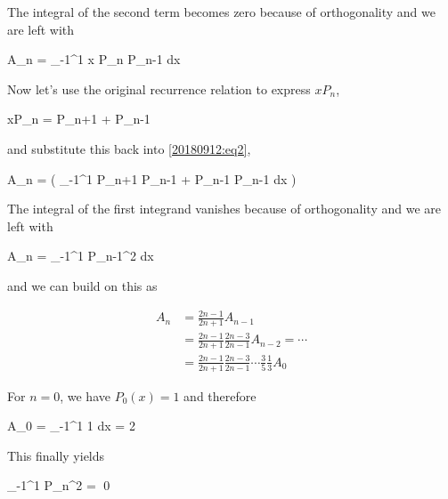 The integral of the second term becomes zero because of orthogonality and we are left with

\be\label{20180912:eq2}
A_n =  \int_{-1}^1 x P_n P_{n-1} dx
\ee

Now let's use the original recurrence relation to express $x P_n$,

\bee
xP_n =  P_{n+1} +  P_{n-1}
\eee

and substitute this back into \eqref{20180912:eq2},

\bee
A_n =  \left( \int_{-1}^1  P_{n+1} P_{n-1} +  P_{n-1} P_{n-1} dx \right)
\eee

The integral of the first integrand vanishes because of orthogonality and we are left with

\bee
A_n =  \int_{-1}^1 P_{n-1}^2 dx
\eee

and we can build on this as

\begin{align*}
  A_n &= \frac{2n-1}{2n+1} A_{n-1} \\
      &= \frac{2n-1}{2n+1} \frac{2n-3}{2n-1} A_{n-2} = \cdots \\
      &= \frac{2n-1}{2n+1} \frac{2n-3}{2n-1} \cdots \frac{3}{5} \frac{1}{3} A_0
\end{align*}

For $n=0$, we have $P_0(x) = 1$ and therefore

\bee
A_0 = \int_{-1}^1 1 dx = 2
\eee

This finally yields

\bee
\int_{-1}^1 P_n^2 =  \qed
\eee





